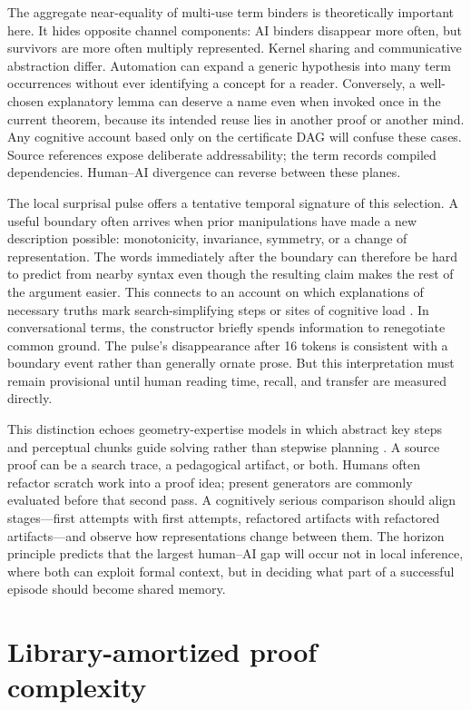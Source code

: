 \documentclass[10pt]{article}
\begin{document}
The aggregate near-equality of multi-use term binders is theoretically important here.  It hides
opposite channel components: AI binders disappear more often, but survivors are more often
multiply represented.  Kernel sharing and communicative abstraction differ.  Automation can expand a generic hypothesis
into many term occurrences without ever identifying a concept for a reader.  Conversely, a
well-chosen explanatory lemma can deserve a name even when invoked once in the current theorem,
because its intended reuse lies in another proof or another mind.  Any cognitive account based
only on the certificate DAG will confuse these cases.  Source references expose deliberate addressability;
the term records compiled dependencies.  Human--AI divergence can reverse between these planes.

The local surprisal pulse offers a tentative temporal signature of this selection.  A useful
boundary often arrives when prior manipulations have made a new description possible: monotonicity,
invariance, symmetry, or a change of representation.  The words immediately after the boundary can
therefore be hard to predict from nearby syntax even though the resulting claim makes the rest of
the argument easier.  This connects to an account on which explanations of necessary truths mark
search-simplifying steps or sites of cognitive load \citep{kardes2025}.  In conversational terms, the constructor briefly spends information to
renegotiate common ground.  The pulse's disappearance after 16 tokens is consistent with a boundary
event rather than generally ornate prose.  But this interpretation must remain provisional until
human reading time, recall, and transfer are measured directly.

This distinction echoes geometry-expertise models in which abstract key steps and perceptual chunks
guide solving rather than stepwise planning \citep{koedinger1990}.  A source proof can be a search
trace, a pedagogical artifact, or both.  Humans often refactor scratch work into a proof idea;
present generators are commonly evaluated before that second pass.  A cognitively serious comparison
should align stages---first attempts with first attempts, refactored artifacts with refactored
artifacts---and observe how representations change between them.  The horizon principle
predicts that the largest human--AI gap will occur not in local inference, where both can exploit
formal context, but in deciding what part of a successful episode should become shared memory.

\section{Library-amortized proof complexity}
\end{document}
